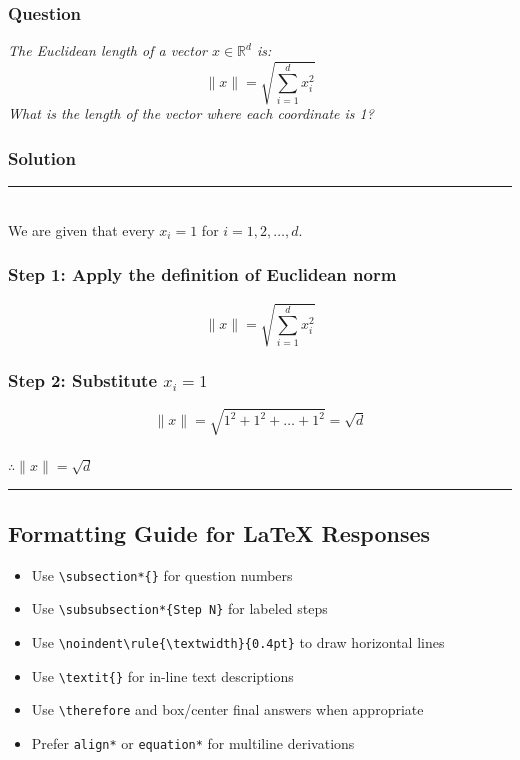 \documentclass[12pt]{article}
\begin{document}
\subsubsection*{Question}
\textit{The Euclidean length of a vector $x \in \mathbb{R}^d$ is:}
$$
\|x\| = \sqrt{\sum_{i=1}^{d} x_i^2}
$$
\textit{What is the length of the vector where each coordinate is 1?}

\subsubsection*{Solution}
\noindent\rule{\textwidth}{0.4pt}\\

We are given that every $x_i = 1$ for $i = 1, 2, \dots, d$.

\subsubsection*{Step 1: Apply the definition of Euclidean norm}
$$
\|x\| = \sqrt{\sum_{i=1}^{d} x_i^2}
$$

\subsubsection*{Step 2: Substitute $x_i = 1$}
$$
\|x\| = \sqrt{1^2 + 1^2 + \dots + 1^2} = \sqrt{d}
$$$$

\subsubsection*{\normalfont}{
$\therefore \|x\| = \sqrt{d}$
}



\noindent\rule{\textwidth}{0.4pt}

\subsection*{Formatting Guide for LaTeX Responses}

\begin{itemize}
  \item Use \texttt{\textbackslash subsection*\{\}} for question numbers
  \item Use \texttt{\textbackslash subsubsection*\{Step N\}} for labeled steps
  \item Use \texttt{\textbackslash noindent\textbackslash rule\{\textbackslash textwidth\}\{0.4pt\}} to draw horizontal lines
  \item Use \texttt{\textbackslash textit\{\}} for in-line text descriptions
  \item Use \texttt{\textbackslash therefore} and box/center final answers when appropriate
  \item Prefer \texttt{align*} or \texttt{equation*} for multiline derivations
\end{itemize}
\end{document}
